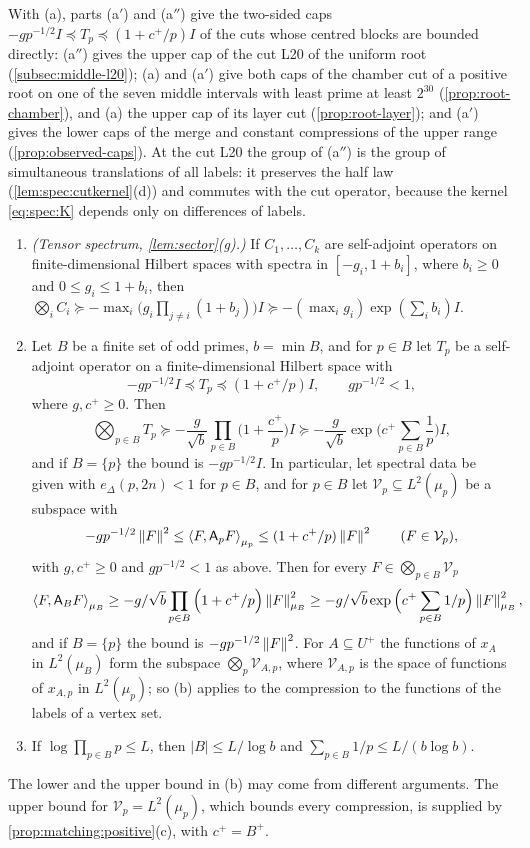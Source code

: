 With (a), parts (a$'$) and (a$''$) give the two-sided caps
$-gp^{-1/2}I\preceq T_p\preceq(1+c^+/p)I$ of the cuts whose centred blocks are
bounded directly: (a$''$) gives the upper cap of the cut L20 of the uniform root
(\cref{subsec:middle-l20}); (a) and (a$'$) give both caps of the chamber cut of a
positive root on one of the seven middle intervals with least prime at least $2^{30}$ (\cref{prop:root-chamber}), and (a) the
upper cap of its layer cut (\cref{prop:root-layer}); and (a$'$) gives the lower
caps of the merge and constant compressions of the upper range
(\cref{prop:observed-caps}). At the cut L20 the
group of (a$''$) is the group of simultaneous translations of all labels: it
preserves the half law (\cref{lem:spec:cutkernel}(d)) and commutes with the cut
operator, because the kernel \eqref{eq:spec:K} depends only on differences of
labels.

\begin{lemma}\label{lem:spec:tensorcomp}
\leavevmode
\begin{enumerate}[label=\textup{(\alph*)}]
\item \emph{(Tensor spectrum, \cref{lem:sector}(g).)} If $C_1,\dots,C_k$ are
  self-adjoint operators on finite-dimensional Hilbert spaces with spectra in
  $[-g_i,1+b_i]$, where $b_i\ge0$ and $0\le g_i\le1+b_i$, then
  $\bigotimes_iC_i\succeq-\max_i\big(g_i\prod_{j\ne i}(1+b_j)\big)I
  \succeq-(\max_ig_i)\exp(\sum_ib_i)I$.
\item Let $B$ be a finite set of odd primes, $b=\min B$, and for $p\in B$ let
  $T_p$ be a self-adjoint operator on a finite-dimensional Hilbert space with
  \[
    -gp^{-1/2}I\preceq T_p\preceq(1+c^+/p)I,\qquad gp^{-1/2}<1,
  \]
  where $g,c^+\ge0$. Then
  \[
    \bigotimes_{p\in B}T_p\succeq-\frac g{\sqrt b}\prod_{p\in B}\Big(1+\frac{c^+}p\Big)I
    \succeq-\frac g{\sqrt b}\exp\Big(c^+\sum_{p\in B}\frac1p\Big)I,
  \]
  and if $B=\{p\}$ the bound is $-gp^{-1/2}I$. In particular, let spectral data
  be given with $e_\Delta(p,2n)<1$ for $p\in B$, and for $p\in B$ let
  $\mathcal V_p\subseteq L^2(\mu_p)$ be a subspace with
  \[
    -gp^{-1/2}\left\|F\right\|^2\le\left\langle F,\mathsf A_p F\right\rangle_{\mu_p}\le(1+c^+/p)\left\|F\right\|^2\qquad
    (F\in\mathcal V_p),
  \]
  with $g,c^+\ge0$ and $gp^{-1/2}<1$ as above.
  Then for every $F\in\bigotimes_{p\in B}\mathcal V_p$
  \[
    \left\langle F,\mathsf A_BF\right\rangle_{\mu_B}\ge-g/\sqrt b\prod_{p\in B}\Big(1+c^+/p\Big)
    \left\|F\right\|^2_{\mu_B}\ge-g/\sqrt b\exp\Big(c^+\sum_{p\in B}1/p\Big)
    \left\|F\right\|^2_{\mu_B},
  \]
  and if $B=\{p\}$ the bound is $-gp^{-1/2}\left\|F\right\|^2$. For $A\subseteq U^+$ the
  functions of $x_A$ in $L^2(\mu_B)$ form the subspace $\bigotimes_p\mathcal
  V_{A,p}$, where $\mathcal V_{A,p}$ is the space of functions of $x_{A,p}$ in
  $L^2(\mu_p)$; so (b) applies to the compression to the functions of the
  labels of a vertex set.
\item If $\log\prod_{p\in B}p\le L$, then $|B|\le L/\log b$ and
  $\sum_{p\in B}1/p\le L/(b\log b)$.
\end{enumerate}
The lower and the upper bound in (b) may come from different arguments. The
upper bound for $\mathcal V_p=L^2(\mu_p)$, which bounds every compression, is
supplied by \cref{prop:matching:positive}(c), with $c^+=B^+$.
\end{lemma}

